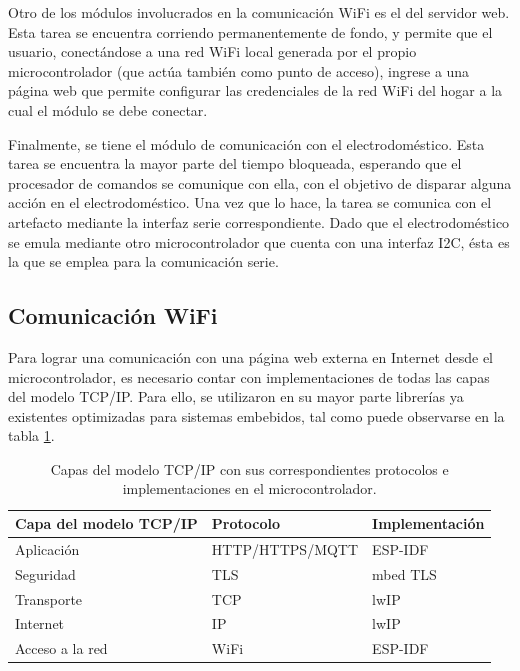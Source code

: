 Otro de los módulos involucrados en la comunicación WiFi es el del servidor web. Esta tarea se encuentra corriendo permanentemente de fondo, y permite que el usuario, conectándose a una red WiFi local generada por el propio microcontrolador (que actúa también como punto de acceso), ingrese a una página web que permite configurar las credenciales de la red WiFi del hogar a la cual el módulo se debe conectar.

Finalmente, se tiene el módulo de comunicación con el electrodoméstico. Esta tarea se encuentra la mayor parte del tiempo bloqueada, esperando que el procesador de comandos se comunique con ella, con el objetivo de disparar alguna acción en el electrodoméstico. Una vez que lo hace, la tarea se comunica con el artefacto mediante la interfaz serie correspondiente. Dado que el electrodoméstico se emula mediante otro microcontrolador que cuenta con una interfaz I2C, ésta es la que se emplea para la comunicación serie.


\subsection{Comunicación WiFi}
\label{sec:wifi_com}

Para lograr una comunicación con una página web externa en Internet desde el microcontrolador, es necesario contar con implementaciones de todas las capas del modelo TCP/IP. Para ello, se utilizaron en su mayor parte librerías ya existentes optimizadas para sistemas embebidos, tal como puede observarse en la tabla \ref{tab:implementacion_capas}.


\begin{table}[h]
	\centering
	\caption{Capas del modelo TCP/IP con sus correspondientes protocolos e implementaciones en el microcontrolador.}
	\begin{tabular}{l l l}    
		\toprule
		\textbf{Capa del modelo TCP/IP}	& \textbf{Protocolo}	& \textbf{Implementación}	\\
		\midrule
		Aplicación			& HTTP/HTTPS/MQTT		& ESP-IDF					\\
		Seguridad			& TLS					& mbed TLS					\\
		Transporte			& TCP					& lwIP						\\
		Internet			& IP					& lwIP						\\
		Acceso a la red 	& WiFi					& ESP-IDF					\\
		\bottomrule
		\hline
	\end{tabular}
	\label{tab:implementacion_capas}
\end{table}

